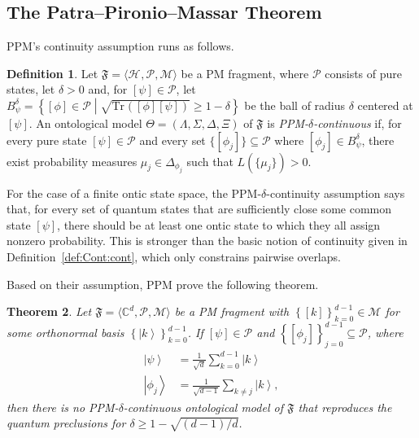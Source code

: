 \documentclass[DIV=calc,fontsize=12pt]{scrartcl} %
\theoremstyle{definition}
\newtheorem{definition}{Definition}[section]
\theoremstyle{plain}
\newtheorem{theorem}[definition]{Theorem}
\newcommand{\Ket}[1]{\ensuremath{\left \vert #1 \right \rangle}}
\newcommand{\Proj}[1]{\ensuremath{\left [ #1 \right ]}}
\newcommand{\Hilb}[1][]{\ensuremath{\mathcal{H}_{#1}}}
\newcommand{\Tr}[2][]{\ensuremath{\text{Tr}_{#1} \left ( #2 \right )}}
\begin{document}
\subsection{The Patra--Pironio--Massar Theorem}

\label{PPM}

PPM's continuity assumption runs as follows.

\begin{definition}
Let $\mathfrak{F} = \langle \Hilb, \mathcal{P}, \mathcal{M} \rangle$
be a PM fragment, where $\mathcal{P}$ consists of pure states, let
$\delta > 0$ and, for $\Proj{\psi} \in \mathcal{P}$, let
$B^{\delta}_{\psi} = \left \{ \Proj{\phi} \in \mathcal{P} \middle |
\sqrt{\Tr{\Proj{\phi}\Proj{\psi}}} \geq 1 - \delta \right \}$ be
the ball of radius $\delta$ centered at $\Proj{\psi}$.  An
ontological model $\Theta = (\Lambda, \Sigma, \Delta, \Xi)$ of
$\mathfrak{F}$ is \emph{PPM-$\delta$-continuous} if, for every pure
state $\Proj{\psi} \in \mathcal{P}$ and every set $\{\Proj{\phi_j}\}
\subseteq \mathcal{P}$ where $\Proj{\phi_j} \in B^{\delta}_{\psi}$,
there exist probability measures $\mu_j \in \Delta_{\phi_j}$ such
that $L(\{\mu_j\}) > 0$.
\end{definition}

For the case of a finite ontic state space, the
PPM-$\delta$-continuity assumption says that, for every set of quantum
states that are sufficiently close some common state $\Proj{\psi}$,
there should be at least one ontic state to which they all assign
nonzero probability.  This is stronger than the basic notion of
continuity given in Definition~\ref{def:Cont:cont}, which only
constrains pairwise overlaps.

Based on their assumption, PPM prove the following theorem.
\begin{theorem}
\label{thm:PPM:PPM}
Let $\mathfrak{F} = \langle \mathbb{C}^d, \mathcal{P}, \mathcal{M}
\rangle$ be a PM fragment with $\left \{ \Proj{k} \right
\}_{k=0}^{d-1} \in \mathcal{M}$ for some orthonormal basis $\left \{
\Ket{k} \right \}_{k=0}^{d-1}$.  If $\Proj{\psi} \in \mathcal{P}$
and $\left \{ \Proj{\phi_j} \right \}_{j=0}^{d-1} \subseteq
\mathcal{P}$, where
\begin{align}
\Ket{\psi} & = \frac{1}{\sqrt{d}}\sum_{k=0}^{d-1} \Ket{k} \\
\Ket{\phi_j} & = \frac{1}{\sqrt{d-1}} \sum_{k \neq j} \Ket{k},
\end{align}
then there is no PPM-$\delta$-continuous ontological model of
$\mathfrak{F}$ that reproduces the quantum preclusions for $\delta
\geq 1 - \sqrt{(d-1)/d}$.
\end{theorem}
\end{document}
